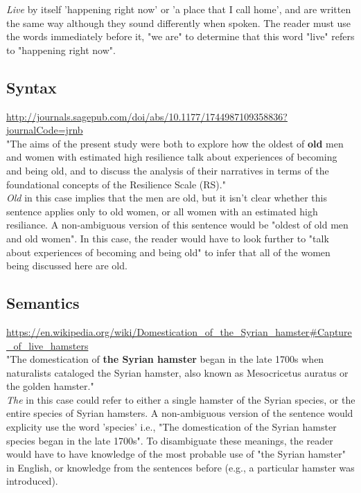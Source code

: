 \documentclass{amsart}
\theoremstyle{definition}
\theoremstyle{remark}
\numberwithin{equation}{section}
\begin{document}
\textit{Live} by itself 'happening right now' or 'a place that I call home', and are written the same way although they sound differently when spoken. The reader must use the words immediately before it, "we are" to determine that this word "live" refers to "happening right now". \\


\subsection{Syntax}

\url{http://journals.sagepub.com/doi/abs/10.1177/1744987109358836?journalCode=jrnb} \\

"The aims of the present study were both to explore how the oldest of \textbf{old} men and women with estimated high resilience talk about experiences of becoming and being old, and to discuss the analysis of their narratives in terms of the foundational concepts of the Resilience Scale (RS)." \\

\textit{Old} in this case implies that the men are old, but it isn't clear whether this sentence applies only to old women, or all women with an estimated high resiliance. A non-ambiguous version of this sentence would be "oldest of old men and old women". In this case, the reader would have to look further to "talk about experiences of becoming and being old" to infer that all of the women being discussed here are old. \\

\subsection{Semantics}

\url{https://en.wikipedia.org/wiki/Domestication_of_the_Syrian_hamster#Capture_of_live_hamsters} \\

"The domestication of \textbf{the Syrian hamster} began in the late 1700s when naturalists cataloged the Syrian hamster, also known as Mesocricetus auratus or the golden hamster." \\

\textit{The} in this case could refer to either a single hamster of the Syrian species, or the entire species of Syrian hamsters. A non-ambiguous version of the sentence would explicity use the word 'species' i.e., "The domestication of the Syrian hamster species began in the late 1700s". To disambiguate these meanings, the reader would have to have knowledge of the most probable use of "the Syrian hamster" in English, or knowledge from the sentences before (e.g., a particular hamster was introduced). \\
\end{document}
